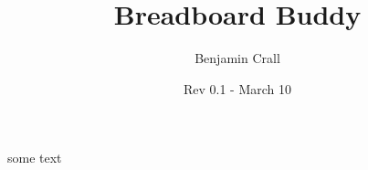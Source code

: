 \documentclass[12pt,letterpaper]{article}
\title{\huge Breadboard Buddy}
\author{{\Large Benjamin Crall}}
\date{Rev 0.1 - March 10}
\begin{document}
\maketitle

some text
\end{document}
